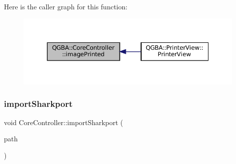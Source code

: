 Here is the caller graph for this function\+:
\nopagebreak
\begin{figure}[H]
\begin{center}
\leavevmode
\includegraphics[width=350pt]{class_q_g_b_a_1_1_core_controller_a130cba4cb7c5d2b98534c9f58cd7ada9_icgraph}
\end{center}
\end{figure}
\mbox{\label{class_q_g_b_a_1_1_core_controller_a9593c570b5f23530f1dedfc9e9a670d6}} 
\subsubsection{\texorpdfstring{import\+Sharkport}{importSharkport}}
{\footnotesize\ttfamily void Core\+Controller\+::import\+Sharkport (\begin{DoxyParamCaption}\item[{const Q\+String \&}]{path }\end{DoxyParamCaption})\hspace{0.3cm}{\ttfamily [slot]}}

